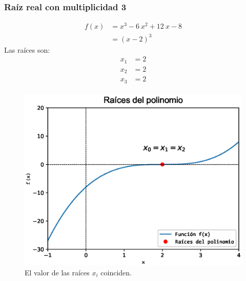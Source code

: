 \begin{frame}[fragile]
\captionsetup{justification=centering}
\frametitle{Raíz real con multiplicidad 3}
\begin{minipage}{5cm}
\fontsize{12}{12}\selectfont
\begin{align*}
f(x) &=  x^{3} - 6 \: x^{2} + 12 \: x - 8 \\
&= (x - 2)^{3}
\end{align*}
Las raíces son:
\begin{align*}
x_{1} &= 2 \\
x_{2} &= 2 \\
x_{3} &= 2 \\
\end{align*}
\end{minipage}
\hspace{0.5cm}
\begin{minipage}{4.5cm}
\begin{figure}
	\centering
	\includegraphics[scale=0.3]{Imagenes/raices_polinomio_2020_02.eps}
	\caption{El valor de las raíces $x_{i}$ coinciden.} 
\end{figure}
\end{minipage}
\end{frame}
